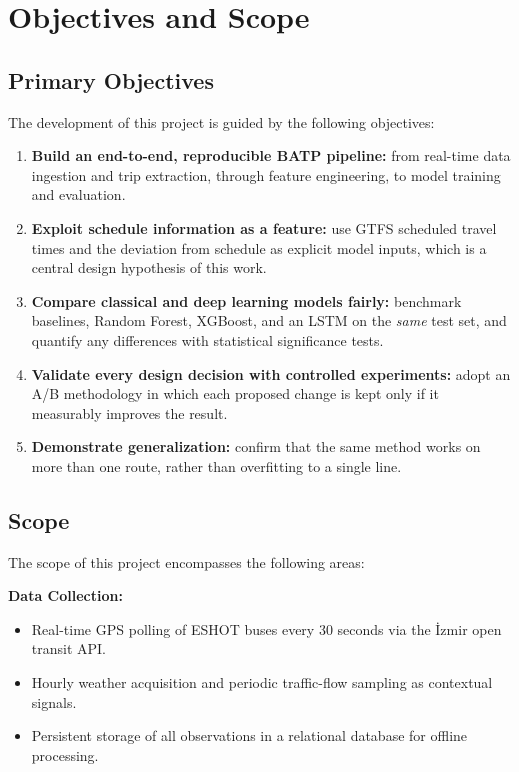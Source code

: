 \section{Objectives and Scope}

\subsection{Primary Objectives}

The development of this project is guided by the following objectives:

\begin{enumerate}
    \item \textbf{Build an end-to-end, reproducible BATP pipeline:} from real-time data ingestion and trip extraction, through feature engineering, to model training and evaluation.
    \item \textbf{Exploit schedule information as a feature:} use GTFS scheduled travel times and the deviation from schedule as explicit model inputs, which is a central design hypothesis of this work.
    \item \textbf{Compare classical and deep learning models fairly:} benchmark baselines, Random Forest, XGBoost, and an LSTM on the \emph{same} test set, and quantify any differences with statistical significance tests.
    \item \textbf{Validate every design decision with controlled experiments:} adopt an A/B methodology in which each proposed change is kept only if it measurably improves the result.
    \item \textbf{Demonstrate generalization:} confirm that the same method works on more than one route, rather than overfitting to a single line.
\end{enumerate}

\subsection{Scope}

The scope of this project encompasses the following areas:

\textbf{Data Collection:}
\begin{itemize}
    \item Real-time GPS polling of ESHOT buses every 30 seconds via the İzmir open transit API.
    \item Hourly weather acquisition and periodic traffic-flow sampling as contextual signals.
    \item Persistent storage of all observations in a relational database for offline processing.
\end{itemize}

